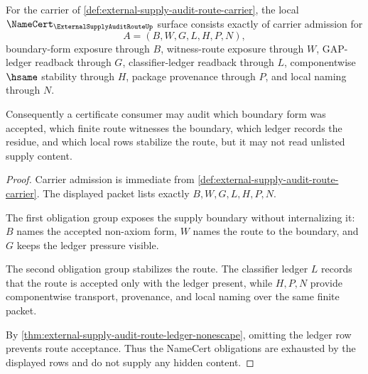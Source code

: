 \begin{theorem}
\label{thm:external-supply-audit-route-namecert-obligations}
For the carrier of \autoref{def:external-supply-audit-route-carrier}, the local $\NameCert_{\ExternalSupplyAuditRouteUp}$ surface consists exactly of carrier admission for
$$
A=(B,W,G,L,H,P,N),
$$
boundary-form exposure through $B$, witness-route exposure through $W$, GAP-ledger readback through $G$, classifier-ledger readback through $L$, componentwise $\hsame$ stability through $H$, package provenance through $P$, and local naming through $N$.

Consequently a certificate consumer may audit which boundary form was accepted, which finite route witnesses the boundary, which ledger records the residue, and which local rows stabilize the route, but it may not read unlisted supply content.
\end{theorem}
\begin{proof}
Carrier admission is immediate from \autoref{def:external-supply-audit-route-carrier}. The displayed packet lists exactly $B,W,G,L,H,P,N$.

The first obligation group exposes the supply boundary without internalizing it: $B$ names the accepted non-axiom form, $W$ names the route to the boundary, and $G$ keeps the ledger pressure visible.

The second obligation group stabilizes the route. The classifier ledger $L$ records that the route is accepted only with the ledger present, while $H,P,N$ provide componentwise transport, provenance, and local naming over the same finite packet.

By \autoref{thm:external-supply-audit-route-ledger-nonescape}, omitting the ledger row prevents route acceptance. Thus the NameCert obligations are exhausted by the displayed rows and do not supply any hidden content.
\end{proof}

